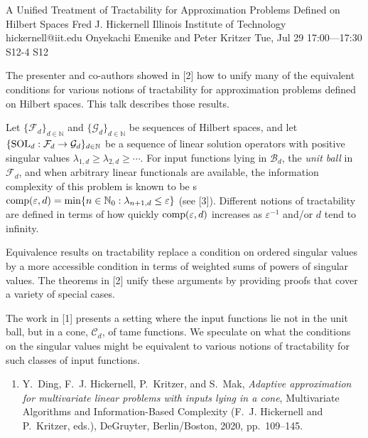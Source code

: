\begin{talk}
  {A Unified Treatment of Tractability for Approximation Problems Defined on Hilbert Spaces}%
  {Fred J. Hickernell}%
  {Illinois Institute of Technology}%
  {hickernell@iit.edu}%
  {Onyekachi Emenike and Peter Kritzer}%
  {}%
  {Tue, Jul 29 17:00---17:30}%
  {S12-4}%
  {S12}%
  
    
   
The presenter and co-authors showed in [2] how to unify many of the equivalent conditions for various notions of tractability for approximation problems defined on Hilbert spaces.  This talk describes those results.

Let $\{\mathcal{F}_d\}_{d \in \mathbb{N}}$ and $\{\mathcal{G}_d\}_{d \in \mathbb{N}}$ be sequences of Hilbert spaces, and let $\{\textup{SOL}_d : \mathcal{F}_d \to \mathcal{G}_d\}_{d \in \mathbb{N}}$ be a sequence of linear solution operators  with positive singular values $\lambda_{1,d} \ge \lambda_{2,d} \ge \cdots$.  For input functions lying in $\mathcal{B}_d$, the \emph{unit ball} in $\mathcal{F}_d$, and when arbitrary linear functionals are available, the information complexity of this problem is known to be s$\textup{comp}(\varepsilon, d) = \min \{n \in \mathbb{N}_0 : \lambda_{n+1, d} \le \varepsilon\}$ (see [3]).  Different notions of tractability are defined in terms of how quickly $\textup{comp}(\varepsilon, d)$  increases as $\varepsilon^{-1}$ and/or $d$ tend to infinity.

Equivalence results on tractability replace a condition on ordered singular values by a more accessible condition in terms of weighted sums of powers of singular values.  The theorems in [2] unify these arguments by providing proofs that cover a variety of special cases.

The work in [1] presents a setting where the input functions lie not in the unit ball, but in a cone, $\mathcal{C}_d$, of tame functions.  We speculate on what the conditions on the  singular values might be equivalent to various notions of tractability for such classes of input functions.

\begin{enumerate}
\renewcommand{\labelenumi}{[\arabic{enumi}]}
    \item
Y.~Ding, F.~J. Hickernell, P.~Kritzer, and S.~Mak, \emph{Adaptive approximation for multivariate linear problems with inputs lying in a cone}, Multivariate Algorithms and Information-Based Complexity (F.~J. Hickernell and P.~Kritzer, eds.), DeGruyter, Berlin/Boston, 2020, pp.~109--145.


\end{enumerate}
\end{talk}
